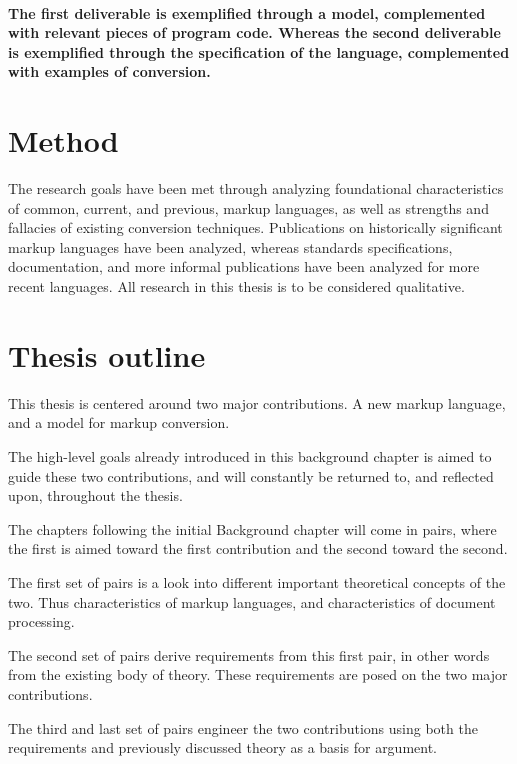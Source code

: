 \documentclass{scrreprt}
\begin{document}
\paragraph{The first deliverable is exemplified through a model, complemented with relevant pieces of program code. Whereas the second deliverable is exemplified through the specification of the language, complemented with examples of conversion.}





\section{Method}
The research goals have been met through analyzing foundational characteristics of common, current, and previous, markup languages, as well as strengths and fallacies of existing conversion techniques. Publications on historically significant markup languages have been analyzed, whereas standards specifications, documentation, and more informal publications have been analyzed for more recent languages. All research in this thesis is to be considered qualitative.







\section{Thesis outline}
\color{red}
This thesis is centered around two major contributions. A new markup language, and a model for markup conversion.

The high-level goals already introduced in this background chapter is aimed to guide these two contributions, and will constantly be returned to, and reflected upon, throughout the thesis.

The chapters following the initial Background chapter will come in pairs, where the first is aimed toward the first contribution and the second toward the second.

The first set of pairs is a look into different important theoretical concepts of the two. Thus characteristics of markup languages, and characteristics of document processing.

The second set of pairs derive requirements from this first pair, in other words from the existing body of theory. These requirements are posed on the two major contributions.

The third and last set of pairs engineer the two contributions using both the requirements and previously discussed theory as a basis for argument.
\end{document}
